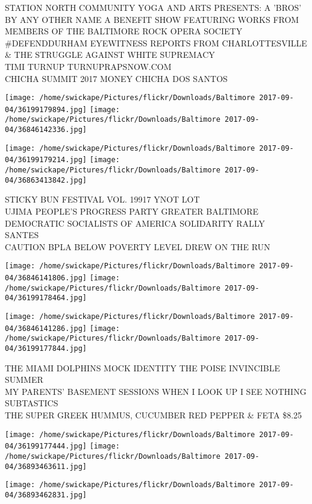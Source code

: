 \documentclass[10pt,letterpaper]{article}
\begin{document}
STATION NORTH COMMUNITY YOGA AND ARTS PRESENTS: A 'BROS' BY ANY OTHER NAME A BENEFIT SHOW FEATURING WORKS FROM MEMBERS OF THE BALTIMORE ROCK OPERA SOCIETY\\
\#DEFENDDURHAM EYEWITNESS REPORTS FROM CHARLOTTESVILLE \& THE STRUGGLE AGAINST WHITE SUPREMACY\\
TIMI TURNUP TURNUPRAPSNOW.COM\\
CHICHA SUMMIT 2017 MONEY CHICHA DOS SANTOS
\pagebreak

\texttt{[image: /home/swickape/Pictures/flickr/Downloads/Baltimore 2017-09-04/36199179894.jpg]}
\texttt{[image: /home/swickape/Pictures/flickr/Downloads/Baltimore 2017-09-04/36846142336.jpg]}

\texttt{[image: /home/swickape/Pictures/flickr/Downloads/Baltimore 2017-09-04/36199179214.jpg]}
\texttt{[image: /home/swickape/Pictures/flickr/Downloads/Baltimore 2017-09-04/36863413842.jpg]}

STICKY BUN FESTIVAL VOL. 19917 YNOT LOT\\
UJIMA PEOPLE'S PROGRESS PARTY GREATER BALTIMORE DEMOCRATIC SOCIALISTS OF AMERICA SOLIDARITY RALLY\\
SANTES\\
CAUTION BPLA BELOW POVERTY LEVEL DREW ON THE RUN
\pagebreak

\texttt{[image: /home/swickape/Pictures/flickr/Downloads/Baltimore 2017-09-04/36846141806.jpg]}
\texttt{[image: /home/swickape/Pictures/flickr/Downloads/Baltimore 2017-09-04/36199178464.jpg]}

\texttt{[image: /home/swickape/Pictures/flickr/Downloads/Baltimore 2017-09-04/36846141286.jpg]}
\texttt{[image: /home/swickape/Pictures/flickr/Downloads/Baltimore 2017-09-04/36199177844.jpg]}

THE MIAMI DOLPHINS MOCK IDENTITY THE POISE INVINCIBLE SUMMER\\
MY PARENTS' BASEMENT SESSIONS WHEN I LOOK UP I SEE NOTHING\\
SUBTASTICS\\
THE SUPER GREEK HUMMUS, CUCUMBER RED PEPPER \& FETA \$8.25
\pagebreak

\texttt{[image: /home/swickape/Pictures/flickr/Downloads/Baltimore 2017-09-04/36199177444.jpg]}
\texttt{[image: /home/swickape/Pictures/flickr/Downloads/Baltimore 2017-09-04/36893463611.jpg]}

\texttt{[image: /home/swickape/Pictures/flickr/Downloads/Baltimore 2017-09-04/36893462831.jpg]}
\end{document}

